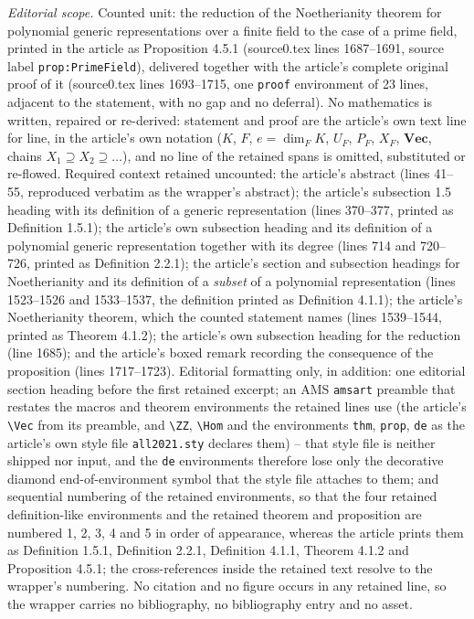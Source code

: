\documentclass[10pt,a4paper]{amsart}
\theoremstyle{plain}
\theoremstyle{definition}
\renewcommand{\Vec}{\mathbf{Vec}}
\begin{document}
\noindent\textit{Editorial scope.} Counted unit: the reduction of the Noetherianity theorem for polynomial generic representations over a finite field to the case of a prime field, printed in the article as Proposition 4.5.1 (source0.tex lines 1687--1691, source label \texttt{prop:PrimeField}), delivered together with the article's complete original proof of it (source0.tex lines 1693--1715, one \texttt{proof} environment of 23 lines, adjacent to the statement, with no gap and no deferral). No mathematics is written, repaired or re-derived: statement and proof are the article's own text line for line, in the article's own notation ($K$, $F$, $e=\dim_F K$, $U_F$, $P_F$, $X_F$, $\Vec$, chains $X_1\supseteq X_2\supseteq\ldots$), and no line of the retained spans is omitted, substituted or re-flowed. Required context retained uncounted: the article's abstract (lines 41--55, reproduced verbatim as the wrapper's abstract); the article's subsection 1.5 heading with its definition of a generic representation (lines 370--377, printed as Definition 1.5.1); the article's own subsection heading and its definition of a polynomial generic representation together with its degree (lines 714 and 720--726, printed as Definition 2.2.1); the article's section and subsection headings for Noetherianity and its definition of a {\em subset} of a polynomial representation (lines 1523--1526 and 1533--1537, the definition printed as Definition 4.1.1); the article's Noetherianity theorem, which the counted statement names (lines 1539--1544, printed as Theorem 4.1.2); the article's own subsection heading for the reduction (line 1685); and the article's boxed remark recording the consequence of the proposition (lines 1717--1723). Editorial formatting only, in addition: one editorial section heading before the first retained excerpt; an AMS \texttt{amsart} preamble that restates the macros and theorem environments the retained lines use (the article's \texttt{\textbackslash Vec} from its preamble, and \texttt{\textbackslash ZZ}, \texttt{\textbackslash Hom} and the environments \texttt{thm}, \texttt{prop}, \texttt{de} as the article's own style file \texttt{all2021.sty} declares them) -- that style file is neither shipped nor input, and the \texttt{de} environments therefore lose only the decorative diamond end-of-environment symbol that the style file attaches to them; and sequential numbering of the retained environments, so that the four retained definition-like environments and the retained theorem and proposition are numbered 1, 2, 3, 4 and 5 in order of appearance, whereas the article prints them as Definition 1.5.1, Definition 2.2.1, Definition 4.1.1, Theorem 4.1.2 and Proposition 4.5.1; the cross-references inside the retained text resolve to the wrapper's numbering. No citation and no figure occurs in any retained line, so the wrapper carries no bibliography, no bibliography entry and no asset.
\end{document}
